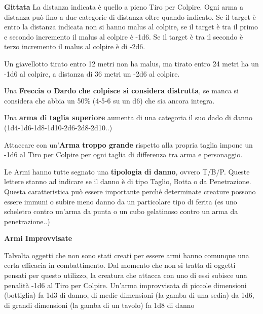\documentclass[a4paper,11pt,twoside,openany]{book}
\begin{document}
{\bigskip

\textbf{Gittata}
La distanza indicata è quello a pieno Tiro per Colpire. Ogni arma a distanza può fino a due categorie di distanza oltre quando indicato. Se il target è entro la distanza indicata non si hanno malus al colpire, se il target è tra il primo e secondo incremento il malus al colpire è -1d6. Se il target è tra il secondo è terzo incremento il malus al colpire è di -2d6.

Un giavellotto tirato entro 12 metri non ha malus, ma tirato entro 24 metri ha un -1d6 al colpire, a distanza di 36 metri un -2d6 al colpire.

\medskip


Una \textbf{Freccia o Dardo che colpisce si considera distrutta}, se manca si considera che abbia un 50\% (4-5-6 su un d6) che sia ancora integra.

\medskip

Una \textbf{arma di taglia superiore} aumenta di una categoria il suo dado di danno (1d4-1d6-1d8-1d10-2d6-2d8-2d10..)

\medskip

Attaccare con un'\textbf{Arma troppo grande} rispetto alla propria taglia impone un -1d6 al Tiro per Colpire per ogni taglia di differenza tra arma e personaggio.

\medskip

Le Armi hanno tutte segnato una \textbf{tipologia di danno}, ovvero T/B/P. 	Queste lettere stanno ad indicare se il danno è di tipo Taglio, Botta 	o da Penetrazione. Questa caratteristica può essere importante perché 	determinate creature possono essere immuni o subire meno danno da 	un particolare tipo di ferita (es uno scheletro contro un'arma da 	punta o un cubo gelatinoso contro un arma da penetrazione..)

\medskip

\textbf{Armi Improvvisate}
	
Talvolta oggetti che non sono stati creati per essere armi hanno comunque una certa efficacia in combattimento. Dal momento che non si tratta di oggetti pensati per questo utilizzo, la creatura che attacca con uno di essi subisce una penalità -1d6 al Tiro per Colpire. Un'arma improvvisata di piccole dimensioni (bottiglia) fa 1d3 di danno, di medie dimensioni (la gamba di una sedia) da 1d6, di grandi dimensioni (la gamba di un tavolo) fa 1d8 di danno
	
}
\end{document}
